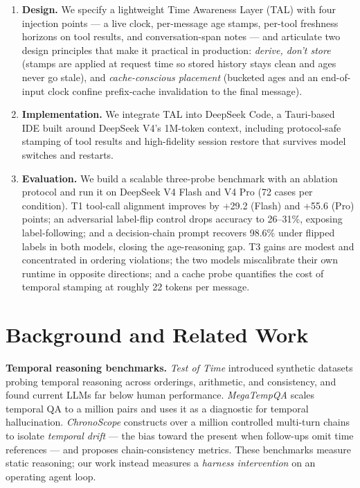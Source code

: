 \documentclass[10pt]{article}
\begin{document}
\begin{enumerate}[leftmargin=1.4em,itemsep=1pt]
  \item \textbf{Design.} We specify a lightweight Time Awareness Layer (TAL) with four
        injection points --- a live clock, per-message age stamps, per-tool freshness
        horizons on tool results, and conversation-span notes --- and articulate two
        design principles that make it practical in production: \emph{derive, don't
        store} (stamps are applied at request time so stored history stays clean and
        ages never go stale), and \emph{cache-conscious placement} (bucketed ages and
        an end-of-input clock confine prefix-cache invalidation to the final message).
  \item \textbf{Implementation.} We integrate TAL into DeepSeek Code, a Tauri-based
        IDE built around DeepSeek V4's 1M-token context, including protocol-safe
        stamping of tool results and high-fidelity session restore that survives
        model switches and restarts.
  \item \textbf{Evaluation.} We build a scalable three-probe benchmark with an
        ablation protocol and run it on DeepSeek V4 Flash and V4 Pro (72 cases per
        condition). T1 tool-call alignment improves by +29.2 (Flash) and +55.6
        (Pro) points; an adversarial label-flip control drops accuracy to
        26--31\%, exposing label-following; and a decision-chain prompt recovers
        98.6\% under flipped labels in both models, closing the age-reasoning gap.
        T3 gains are modest and concentrated in ordering violations; the two models
        miscalibrate their own runtime in opposite directions; and a cache probe
        quantifies the cost of temporal stamping at roughly 22 tokens per message.
\end{enumerate}

\section{Background and Related Work}
\label{sec:related}

\textbf{Temporal reasoning benchmarks.} \emph{Test of Time} \cite{testoftime}
introduced synthetic datasets probing temporal reasoning across orderings,
arithmetic, and consistency, and found current LLMs far below human performance.
\emph{MegaTempQA} \cite{megatempqa} scales temporal QA to a million pairs and uses it
as a diagnostic for temporal hallucination. \emph{ChronoScope} \cite{chronoscope}
constructs over a million controlled multi-turn chains to isolate \emph{temporal
drift} --- the bias toward the present when follow-ups omit time references --- and
proposes chain-consistency metrics. These benchmarks measure static reasoning; our
work instead measures a \emph{harness intervention} on an operating agent loop.
\end{document}
